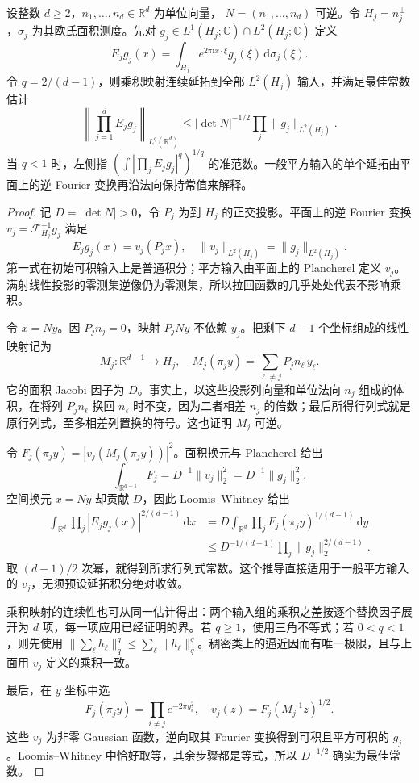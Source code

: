 \begin{proposition}[平直横截延拓]\label{b2:prop:25-flat-extension}
设整数 \(d\geq2\)，\(n_1,\ldots,n_d\in\mathbb R^d\) 为单位向量，
\(N=(n_1,\ldots,n_d)\) 可逆。令 \(H_j=n_j^\perp\)，\(\sigma_j\) 为其欧氏面积测度。先对
\(g_j\in L^1(H_j;\mathbb C)\cap L^2(H_j;\mathbb C)\) 定义
\[
 E_jg_j(x)=\int_{H_j}e^{2\pi\mathrm i x\cdot\xi}
                          g_j(\xi)\,\mathrm d\sigma_j(\xi).
\]
令 \(q=2/(d-1)\)，则乘积映射连续延拓到全部 \(L^2(H_j)\) 输入，并满足最佳常数估计
\[
 \left\|\prod_{j=1}^dE_jg_j\right\|_{L^q(\mathbb R^d)}
 \leq|\det N|^{-1/2}\prod_j\|g_j\|_{L^2(H_j)}.
\]
当 \(q<1\) 时，左侧指 \((\int|\prod_jE_jg_j|^q)^{1/q}\) 的准范数。一般平方输入的单个延拓由平面上的逆 Fourier 变换再沿法向保持常值来解释。
\end{proposition}
\begin{proof}
记 \(D=|\det N|>0\)，令 \(P_j\) 为到 \(H_j\) 的正交投影。平面上的逆 Fourier 变换 \(v_j=\mathcal F_{H_j}^{-1}g_j\) 满足
\[
 E_jg_j(x)=v_j(P_jx),
 \quad \|v_j\|_{L^2(H_j)}=\|g_j\|_{L^2(H_j)}.
\]
第一式在初始可积输入上是普通积分；平方输入由平面上的 Plancherel 定义 \(v_j\)。满射线性投影的零测集逆像仍为零测集，所以拉回函数的几乎处处代表不影响乘积。

令 \(x=Ny\)。因 \(P_jn_j=0\)，映射 \(P_jNy\) 不依赖 \(y_j\)。把剩下 \(d-1\) 个坐标组成的线性映射记为
\[
 M_j:\mathbb R^{d-1}\to H_j,
 \quad
 M_j(\pi_jy)=\sum_{\ell\ne j}P_jn_\ell\,y_\ell.
\]
它的面积 Jacobi 因子为 \(D\)。事实上，以这些投影列向量和单位法向 \(n_j\) 组成的体积，在将列 \(P_jn_\ell\) 换回 \(n_\ell\) 时不变，因为二者相差 \(n_j\) 的倍数；最后所得行列式就是原行列式，至多相差列置换的符号。这也证明 \(M_j\) 可逆。

令 \(F_j(\pi_jy)=|v_j(M_j(\pi_jy))|^2\)。面积换元与 Plancherel 给出
\[
 \int_{\mathbb R^{d-1}}F_j
 =D^{-1}\|v_j\|_2^2=D^{-1}\|g_j\|_2^2.
\]
空间换元 \(x=Ny\) 却贡献 \(D\)，因此 Loomis--Whitney 给出
\[
 \begin{aligned}
 \int_{\mathbb R^d}\prod_j|E_jg_j(x)|^{2/(d-1)}\,\mathrm dx
 &=D\int_{\mathbb R^d}\prod_jF_j(\pi_jy)^{1/(d-1)}\,\mathrm dy\\
 &\leq D^{-1/(d-1)}\prod_j\|g_j\|_2^{2/(d-1)}.
 \end{aligned}
\]
取 \((d-1)/2\) 次幂，就得到所求行列式常数。这个推导直接适用于一般平方输入的 \(v_j\)，无须预设延拓积分绝对收敛。

乘积映射的连续性也可从同一估计得出：两个输入组的乘积之差按逐个替换因子展开为 \(d\) 项，每一项应用已经证明的界。若 \(q\geq1\)，使用三角不等式；若 \(0<q<1\)，则先使用
\(\|\sum_\ell h_\ell\|_q^q\leq\sum_\ell\|h_\ell\|_q^q\)。稠密类上的逼近因而有唯一极限，且与上面用 \(v_j\) 定义的乘积一致。

最后，在 \(y\) 坐标中选
\[
 F_j(\pi_jy)=\prod_{i\ne j}e^{-2\pi y_i^2},
 \quad v_j(z)=F_j(M_j^{-1}z)^{1/2}.
\]
这些 \(v_j\) 为非零 Gaussian 函数，逆向取其 Fourier 变换得到可积且平方可积的 \(g_j\)。Loomis--Whitney 中恰好取等，其余步骤都是等式，所以 \(D^{-1/2}\) 确实为最佳常数。
\end{proof}

